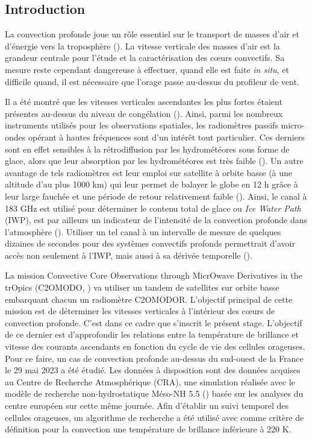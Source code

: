 \documentclass[12pt]{article}
\begin{document}
\begin{multicols}{2}

\section{Introduction}

La convection profonde joue un rôle essentiel sur le transport de masses d’air et d’énergie vers la troposphère (\cite{Kerry}). La vitesse verticale des masses d’air est la grandeur centrale pour l’étude et la caractérisation des cœurs convectifs. Sa mesure reste cependant dangereuse à effectuer, quand elle est faite \textit{in situ}, et difficile quand, il est nécessaire que l'orage passe au-dessus du profileur de vent.

Il a été montré que les vitesses verticales ascendantes les plus fortes étaient présentes au-dessus du niveau de congélation (\cite{DarwinAustralia}). Ainsi, parmi les nombreux instruments utilisés pour les observations spatiales, les radiomètres passifs micro-ondes opérant à hautes fréquences sont d’un intérêt tout particulier. Ces derniers sont en effet sensibles à la rétrodiffusion par les hydrométéores sous forme de glace, alors que leur absorption par les hydrométéores est très faible (\cite{Chaboureau}). Un autre avantage de tels radiomètres est leur emploi sur satellite à orbite basse (à une altitude d’au plus 1000 km) qui leur permet de balayer le globe en 12 h grâce à leur large fauchée et une période de retour relativement faible (\cite{Chaboureau}). Ainsi, le canal à 183 GHz est utilisé pour déterminer le contenu total de glace ou \textit{Ice Water Path} (IWP), est par ailleurs un indicateur de l’intensité de la convection profonde dans l’atmosphère (\cite{RYSMAN2021105244}). Utiliser un tel canal à un intervalle de mesure de quelques dizaines de secondes pour des systèmes convectifs profonds permettrait d’avoir accès non seulement à l’IWP, mais aussi à sa dérivée temporelle (\cite{Chaboureau}).

La mission Convective Core Observations through MicrOwave Derivatives in the trOpics (C2OMODO, \cite{brogniez}) va utiliser un tandem de satellites sur orbite basse embarquant chacun un radiomètre C2OMODOR. L'objectif principal de cette mission est de déterminer les vitesses verticales à l'intérieur des c\oe urs de convection profonde. C'est dans ce cadre que s'inscrit le présent stage. L'objectif de ce dernier est d'approfondir les relations entre la température de brillance et vitesse des courants ascendants en fonction du cycle de vie des cellules orageuses. Pour ce faire, un cas de convection profonde au-dessus du sud-ouest de la France le 29 mai 2023 a été étudié. Les données à disposition sont des données acquises au Centre de Recherche Atmosphérique (CRA), une simulation réalisée avec le modèle de recherche non-hydrostatique Méso-NH 5.5 (\cite{lac2018}) basée sur les analyses du centre européen sur cette même journée. Afin d'établir un suivi temporel des cellules orageuses, un algorithme de recherche a été utilisé avec comme critère de définition pour la convection une température de brillance inférieure à 220 K. 


\end{multicols}
\end{document}
